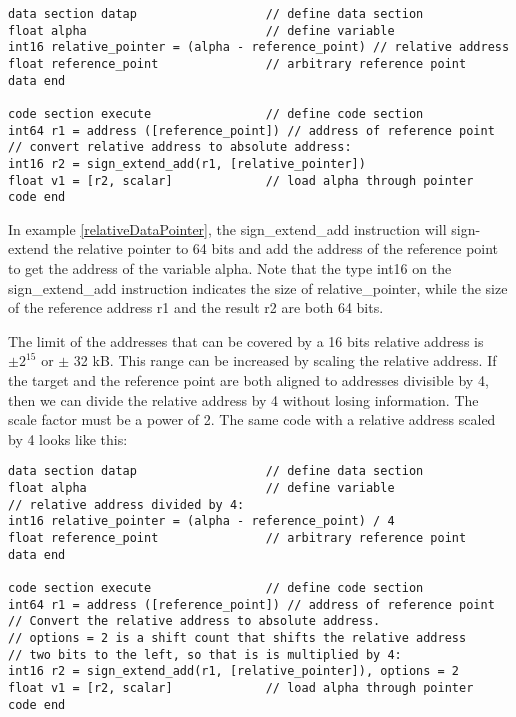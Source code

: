 \documentclass[forwardcom.tex]{subfiles}
\begin{document}
\begin{example}
\label{relativeDataPointer}
\end{example}
\begin{lstlisting}[frame=single]
data section datap                  // define data section
float alpha                         // define variable
int16 relative_pointer = (alpha - reference_point) // relative address
float reference_point               // arbitrary reference point
data end

code section execute                // define code section
int64 r1 = address ([reference_point]) // address of reference point
// convert relative address to absolute address:
int16 r2 = sign_extend_add(r1, [relative_pointer])
float v1 = [r2, scalar]             // load alpha through pointer
code end
\end{lstlisting}
\vv

In example \ref{relativeDataPointer}, the sign\_extend\_add instruction will sign-extend the relative pointer to 64 bits and add the address of the reference point to get the address of the variable alpha. Note that the type int16 on the sign\_extend\_add instruction indicates the size of relative\_pointer, while the size of the reference address r1 and the result r2 are both 64 bits.
\vv

The limit of the addresses that can be covered by a 16 bits relative address is $\pm 2^{15}$ or $\pm$ 32 kB. This range can be increased by scaling the relative address. If the target and the reference point are both aligned to addresses divisible by 4, then we can divide the relative address by 4 without losing information. The scale factor must be a power of 2. The same code with a relative address scaled by 4 looks like this:

\begin{example}
\label{relativeDataPointerScaled}
\end{example}
\begin{lstlisting}[frame=single]
data section datap                  // define data section
float alpha                         // define variable
// relative address divided by 4:
int16 relative_pointer = (alpha - reference_point) / 4
float reference_point               // arbitrary reference point
data end

code section execute                // define code section
int64 r1 = address ([reference_point]) // address of reference point
// Convert the relative address to absolute address. 
// options = 2 is a shift count that shifts the relative address 
// two bits to the left, so that is is multiplied by 4:
int16 r2 = sign_extend_add(r1, [relative_pointer]), options = 2
float v1 = [r2, scalar]             // load alpha through pointer
code end
\end{lstlisting}
\vv
\end{document}
